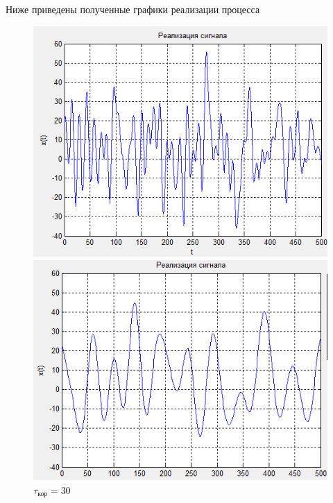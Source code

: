  Ниже приведены полученные графики реализации процесса
 \begin{figure}[H]
 	\begin{minipage}{0.3\linewidth}
 		\centering
        \includegraphics[width=\linewidth]{fig/fig1_t10}
 		\caption*{$\tau_\text{кор}=10$}
 	\end{minipage}
 \begin{minipage}{0.3\linewidth}
 	\centering
    \includegraphics[width=\linewidth]{fig/fig1_t30}
 	\caption*{$\tau_\text{кор}=30$}
 \end{minipage}
\begin{minipage}{0.3\linewidth}
	\centering

\end{minipage}
\end{figure}
